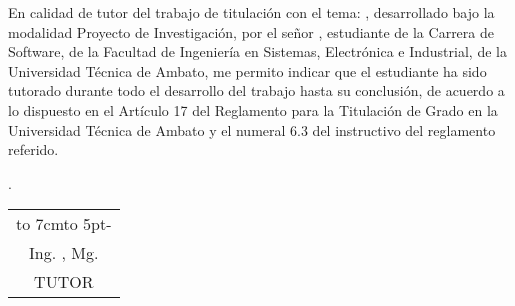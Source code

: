 \newpage
{}

En calidad de tutor del trabajo de titulación con el tema:
{\MakeUppercase\tema},
desarrollado bajo
la modalidad Proyecto de Investigación, por el señor \autor,
estudiante de la Carrera de Software, de la Facultad de Ingeniería en Sistemas, Electrónica e Industrial, de la
Universidad Técnica de Ambato, me permito indicar que el estudiante ha sido tutorado
durante todo el desarrollo del trabajo hasta su conclusión, de acuerdo a lo dispuesto en
el Artículo 17 del Reglamento para la Titulación de Grado en la Universidad Técnica
de Ambato y el numeral 6.3 del instructivo del reglamento referido.

\begin{flushright}
	\lugarFechaPrelims.
\end{flushright}

\vspace*{5cm}
\begin{center}
	\begin{tabular}{c}
		\hbox to 7cm{\leaders\hbox to 5pt{\hss - \hss}\hfil} \\
		Ing. \tutor, Mg.                                     \\
		TUTOR
	\end{tabular}
\end{center}
